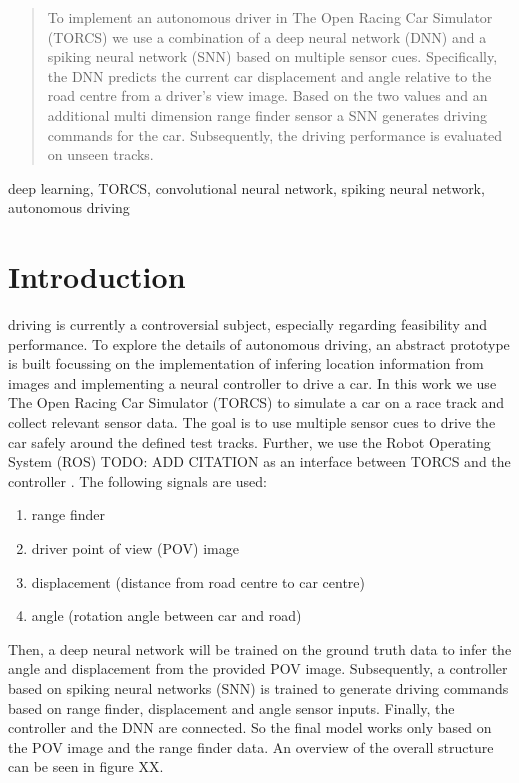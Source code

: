 \documentclass[10pt,a4paper,twoside,journal]{IEEEtran}
\begin{document}
\begin{abstract}
	To implement an autonomous driver in The Open Racing Car Simulator (TORCS)
	we use a combination of a deep neural network (DNN) and a spiking neural network (SNN) based on multiple
	sensor cues. Specifically, the DNN predicts the current car displacement
	and angle relative to the road centre from a driver's view image. Based on the two values
	and an additional multi dimension range finder sensor a SNN generates driving commands for the car. Subsequently, the driving performance is evaluated on unseen tracks.
\end{abstract}

\begin{IEEEkeywords}
	deep learning, TORCS, convolutional neural network, spiking neural network, autonomous driving
\end{IEEEkeywords}

%
%
\section{Introduction}
\label{sc:intro}

 driving is currently a controversial subject, especially 
regarding feasibility and performance. To explore the details of autonomous driving, an abstract prototype is built focussing on the implementation of infering location information from images and implementing a neural controller to drive a car. In this work we use The Open Racing Car Simulator (TORCS) to simulate a car on a race track and collect relevant sensor data. The goal is to use multiple sensor cues to drive the car safely around the defined test tracks. Further, we use the Robot Operating System (ROS) TODO: ADD CITATION as an interface between TORCS and the controller \cite{mirus_torcs-ros_2017}. The following signals are used:
\begin{enumerate}
	\item range finder
	\item driver point of view (POV) image
	\item displacement (distance from road centre to car centre)
	\item angle (rotation angle between car and road)
\end{enumerate}
Then, a deep neural network will be trained on the ground truth data to infer the angle and displacement from the provided POV image. Subsequently, a controller based on spiking neural networks (SNN) is trained to generate driving commands based on range finder, displacement and angle sensor inputs. Finally, the controller and the DNN are connected. So the final model works only based on the POV image and the range finder data. An overview of the overall structure can be seen in figure XX.
\end{document}
